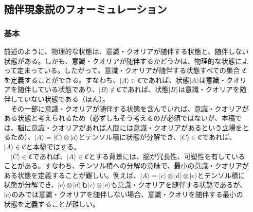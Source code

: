 \subsection{随伴現象説のフォーミュレーション}
\subsubsection{基本}
前述のように、物理的な状態は、意識・クオリアが随伴する状態と、随伴しない状態がある。しかも、意識・クオリアが随伴するかどうかは、物理的な状態によって定まっている。したがって、意識・クオリアが随伴する状態すべての集合 $\mathfrak{C}$ を定義することができる。すなわち、$|A\rangle \in \mathfrak{C}$であれば、状態$|A\rangle$は意識・クオリアを随伴している状態であり、$|B\rangle \notin \mathfrak{C}$であれば、状態$|B\rangle$は意識・クオリアを随伴していない状態である（ほん）。\\
　その一部に意識・クオリアが随伴する状態を含んでいれば、意識・クオリアがある状態と考えられるため（必ずしもそう考えるのが必須ではないが、本稿では、脳に意識・クオリアがあれば人間には意識・クオリアがあるという立場をとるため）、$|A\rangle = |C\rangle \otimes |d\rangle$とテンソル積に状態が分解でき、$|C\rangle\in\mathfrak{C}$であれば、$|A\rangle\in\mathfrak{C}$と本稿ではする。\\
　$|C\rangle\in\mathfrak{C}$であれば、$|A\rangle\in\mathfrak{C}$とする背景には、脳が冗長性、可塑性を有していることがある。すなわち、テンソル積への分解の意味で、最小の意識・クオリアがある状態を定義することが難しい。例えば、$|A\rangle = |c\rangle \otimes |d\rangle \otimes |e\rangle$とテンソル積に状態が分解でき、$|c\rangle \otimes |d\rangle$も$|c\rangle \otimes |e\rangle$も意識・クオリアを随伴する状態であるが、$|c\rangle$のみでは意識・クオリアを随伴しない場合、意識・クオリを随伴する最小の状態を定義することが難しい。